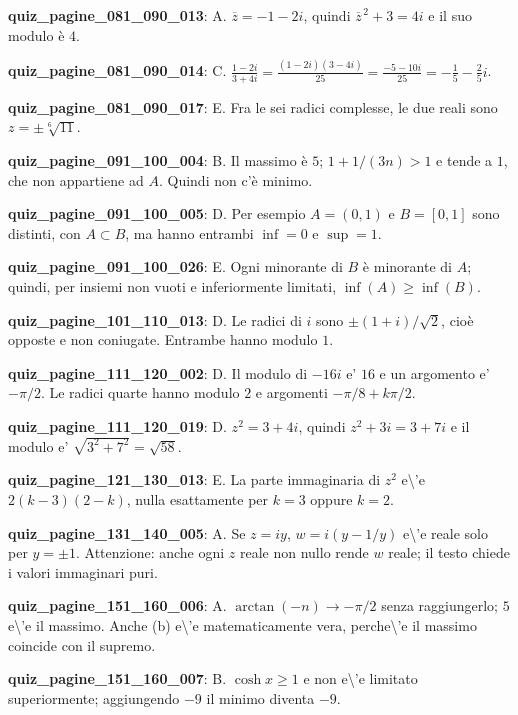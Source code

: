 \documentclass[11pt,a4paper]{article}
\newcounter{quiz}
\begin{document}
\noindent\textbf{quiz\_pagine\_081\_090\_013}: A. $\overline z=-1-2i$, quindi $\overline z^{\,2}+3=4i$ e il suo modulo è $4$.\par\medskip
\noindent\textbf{quiz\_pagine\_081\_090\_014}: C. $\frac{1-2i}{3+4i}=\frac{(1-2i)(3-4i)}{25}=\frac{-5-10i}{25}=-\frac15-\frac25i$.\par\medskip
\noindent\textbf{quiz\_pagine\_081\_090\_017}: E. Fra le sei radici complesse, le due reali sono $z=\pm\sqrt[6]{11}$.\par\medskip
\noindent\textbf{quiz\_pagine\_091\_100\_004}: B. Il massimo è $5$; $1+1/(3n)>1$ e tende a $1$, che non appartiene ad $A$. Quindi non c'è minimo.\par\medskip
\noindent\textbf{quiz\_pagine\_091\_100\_005}: D. Per esempio $A=(0,1)$ e $B=[0,1]$ sono distinti, con $A\subset B$, ma hanno entrambi $\inf=0$ e $\sup=1$.\par\medskip
\noindent\textbf{quiz\_pagine\_091\_100\_026}: E. Ogni minorante di $B$ è minorante di $A$; quindi, per insiemi non vuoti e inferiormente limitati, $\inf(A)\geq\inf(B)$.\par\medskip
\noindent\textbf{quiz\_pagine\_101\_110\_013}: D. Le radici di $i$ sono $\pm(1+i)/\sqrt2$, cioè opposte e non coniugate. Entrambe hanno modulo $1$.\par\medskip
\noindent\textbf{quiz\_pagine\_111\_120\_002}: D. Il modulo di $-16i$ e' $16$ e un argomento e' $-\pi/2$. Le radici quarte hanno modulo $2$ e argomenti $-\pi/8+k\pi/2$.\par\medskip
\noindent\textbf{quiz\_pagine\_111\_120\_019}: D. $z^2=3+4i$, quindi $z^2+3i=3+7i$ e il modulo e' $\sqrt{3^2+7^2}=\sqrt{58}$.\par\medskip
\noindent\textbf{quiz\_pagine\_121\_130\_013}: E. La parte immaginaria di $z^2$ e\textbackslash{}'e $2(k-3)(2-k)$, nulla esattamente per $k=3$ oppure $k=2$.\par\medskip
\noindent\textbf{quiz\_pagine\_131\_140\_005}: A. Se $z=iy$, $w=i(y-1/y)$ e\textbackslash{}'e reale solo per $y=\pm1$. Attenzione: anche ogni $z$ reale non nullo rende $w$ reale; il testo chiede i valori immaginari puri.\par\medskip
\noindent\textbf{quiz\_pagine\_151\_160\_006}: A. $\arctan(-n)\to-\pi/2$ senza raggiungerlo; $5$ e\textbackslash{}'e il massimo. Anche (b) e\textbackslash{}'e matematicamente vera, perche\textbackslash{}'e il massimo coincide con il supremo.\par\medskip
\noindent\textbf{quiz\_pagine\_151\_160\_007}: B. $\cosh x\geq1$ e non e\textbackslash{}'e limitato superiormente; aggiungendo $-9$ il minimo diventa $-9$.\par\medskip
\end{document}
